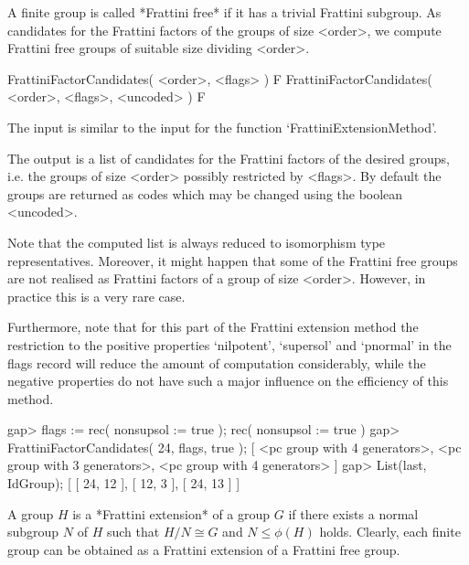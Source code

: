 

A finite group is called *Frattini free* if it has a trivial
Frattini subgroup. As candidates for the Frattini factors of
the groups of size <order>, we compute Frattini free groups of
suitable size dividing <order>.

\>FrattiniFactorCandidates( <order>, <flags> ) F
\>FrattiniFactorCandidates( <order>, <flags>, <uncoded> ) F

The input is similar to the input for the function
`FrattiniExtensionMethod'.

The output is a list of candidates for the Frattini factors of the
desired groups, i.e. the groups of size <order> possibly restricted
by <flags>. By default the groups are returned as codes which may
be changed using the boolean <uncoded>.

Note that the computed list is always reduced to isomorphism type
representatives. Moreover, it might happen that some of the Frattini
free groups are not realised as Frattini factors of a group of size
<order>. However, in practice this is a very rare case.

Furthermore, note that for this part of the Frattini extension method
the restriction to the positive properties `nilpotent', `supersol' and
`pnormal' in the flags record will reduce the amount of computation
considerably, while the negative properties do not have such a major
influence on the efficiency of this method.

\beginexample
gap> flags := rec( nonsupsol := true );
rec( nonsupsol := true )
gap> FrattiniFactorCandidates( 24, flags, true );
[ <pc group with 4 generators>, <pc group with 3 generators>, 
  <pc group with 4 generators> ]
gap> List(last, IdGroup);
[ [ 24, 12 ], [ 12, 3 ], [ 24, 13 ] ]
\endexample



A group $H$ is a *Frattini extension* of a group $G$ if there
exists a normal subgroup $N$ of $H$ such that $H/N \cong G$ and
$N \leq \phi(H)$ holds. Clearly, each finite group can be obtained
as a Frattini extension of a Frattini free group.

